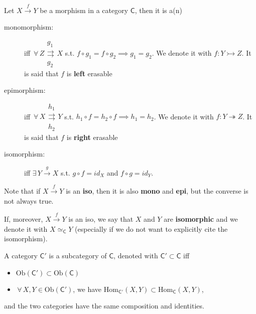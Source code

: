 \begin{defn}
	Let $X \xrightarrow{f} Y$ be a morphism in a category $\mathsf{C}$, then it is a(n)
	\begin{description}
		\item[monomorphism:] iff $\,\forall\, Z \begin{matrix} g_1 \\ \rightrightarrows \\ g_2 \end{matrix} X$ s.t. $f \circ g_1 = f \circ g_2 \implies g_1 = g_2$.
			We denote it with $f: Y \rightarrowtail Z$.
			It is said that $f$ is \textbf{left} erasable
		\item[epimorphism:] iff $\,\forall\, X \begin{matrix} h_1 \\ \rightrightarrows \\ h_2 \end{matrix} Y$ s.t. $h_1 \circ f = h_2 \circ f \implies h_1 = h_2$.
			We denote it with $f: Y \twoheadrightarrow Z$.
			It is said that $f$ is \textbf{right} erasable
		\item[isomorphism:] iff $\exists\,  Y \xrightarrow{g} X$ s.t. $g \circ f = id_X$ and $f \circ g = id_Y$.
	\end{description} 	
\end{defn}

\begin{rem}
	Note that if $X \xrightarrow{f} Y$ is an \textbf{iso}, then it is also \textbf{mono} and \textbf{epi}, but the converse is not always true.

	If, moreover, $X \xrightarrow{f} Y$ is an iso, we say that $X$ and $Y$ are \textbf{isomorphic} and we denote it with $X \simeq_{\mathsf{C}} Y$ (especially if we do not want to explicitly cite the isomorphism).
\end{rem}

\begin{defn}[Subcategory]
	A category $\mathsf{C}'$ is a subcategory of $\mathsf{C}$, denoted with $\mathsf{C}' \subset \mathsf{C}$ iff
	\begin{itemize}
		\item $\mathrm{Ob}(\mathsf{C}') \subset \mathrm{Ob}(\mathsf{C})$
		\item $\,\forall\, X,Y \in \mathrm{Ob}(\mathsf{C}')$, we have $\mathrm{Hom}_{\mathsf{C}'} \left( X, Y \right) \subset \mathrm{Hom}_{\mathsf{C}} \left( X, Y \right)$,
	\end{itemize} 
	and the two categories have the same composition and identities.
\end{defn}


